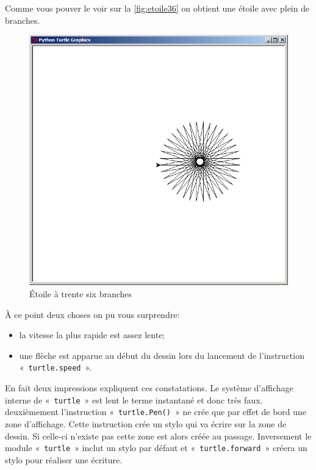 Comme vous pouver le voir sur la \autoref{fig:etoile36} on obtient une étoile avec plein de branches.
\begin{figure}[h!]
\centering
\includegraphics[scale=0.4]{images/etoile36}
\caption{Étoile à trente six branches}\label{fig:etoile36}
\end{figure}

À ce point deux choses on pu vous surprendre:
\begin{itemize}
\item la vitesse la plus rapide est assez lente;
\item une flèche est apparue au début du dessin lors du lancement de l'instruction\\
«~\texttt{turtle.speed}~». 
\end{itemize}

En fait deux impressions expliquent ces constatations. Le système d'affichage interne de «~\texttt{turtle}~» est lent le terme instantané et donc très faux. deuxièmement l'instruction «~\texttt{turtle.Pen()}~» ne crée que par effet de bord une zone d'affichage. Cette instruction crée un stylo qui va écrire sur la zone de dessin. Si celle-ci n'existe pas cette zone est alors créée au passage. Inversement le module «~\texttt{turtle}~» inclut un stylo par défaut et «~\texttt{turtle.forward}~» créera un stylo pour réaliser une écriture.

